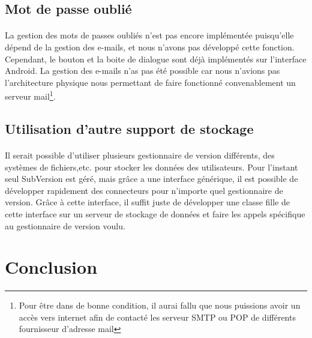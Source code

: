 \documentclass[a4paper,12pt]{article}
\begin{document}
\subsection{Mot de passe oublié}
\paragraph*{}
La gestion des mots de passes oubliés n'est pas encore implémentée puisqu'elle dépend de la gestion des e-mails, et nous n'avons pas développé cette fonction. Cependant, le bouton et la boite de dialogue sont déjà implémentés sur l'interface Android. La gestion des e-mails n'as pas été possible car nous n'avions pas l'architecture physique nous permettant de faire fonctionné convenablement un serveur mail\footnote{Pour être dans de bonne condition, il aurai fallu que nous puissions avoir un accès vers internet afin de contacté les serveur SMTP ou POP de différents fournisseur d'adresse mail}.

\subsection{Utilisation d'autre support de stockage}
\paragraph*{}
Il serait possible d'utiliser plusieurs gestionnaire de version différents, des systèmes de fichiers,etc. pour stocker les données des utilisateurs. Pour l'instant seul SubVersion est géré, mais grâce a une interface générique, il est possible de développer rapidement des connecteurs pour n'importe quel gestionnaire de version. Grâce à cette interface, il suffit juste de développer une classe fille de cette interface sur un serveur de stockage de données et faire les appels spécifique au gestionnaire de version voulu.

\newpage

\section{Conclusion}
\paragraph*{}



\newpage
\listoffigures
\end{document}
